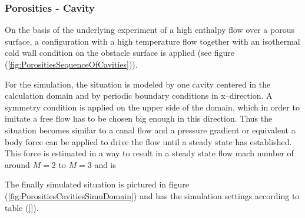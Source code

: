 \documentclass[11pt,a4paper,twoside]{report}
\begin{document}

\subsubsection{Porosities - Cavity}
\label{sec:SimuSetup_Cavity}
On the basis of the underlying experiment of a high enthalpy flow over a porous surface, a configuration with a high temperature %
flow together with an isothermal cold wall condition on the obstacle surface is applied (see figure (\ref{fig:PorositiesSequenceOfCavities})). 

For the simulation, the situation is modeled by one cavity centered in the calculation domain and by periodic boundary conditions in x--direction. A symmetry condition is applied on the upper side of the domain, which in order to imitate a free flow has to be chosen big enough in this direction. Thus the situation becomes similar to a canal flow and a pressure gradient or equivalent a body force can be applied to drive the flow until a steady state has established. This force is estimated in a way to result in a steady state flow mach number of around $M=2$ to $M=3$ and is 

The finally simulated situation is pictured in figure (\ref{fig:PorositiesCavitiesSimuDomain}) and has the simulation settings according to table (\ref{}).
\end{document}
